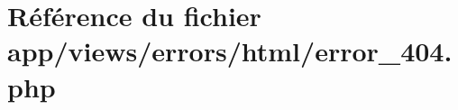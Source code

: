 \hypertarget{html_2error__404_8php}{}\section{Référence du fichier app/views/errors/html/error\+\_\+404.php}
\label{html_2error__404_8php}

